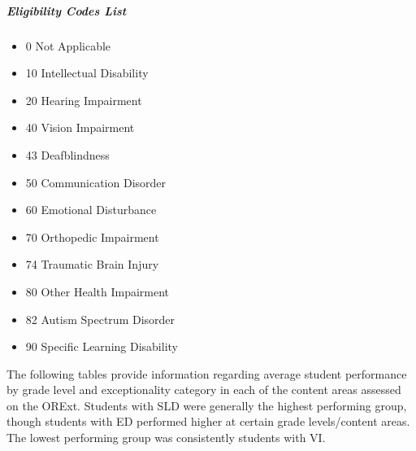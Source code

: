 \documentclass[]{article}
\providecommand{\tightlist}{%
  \setlength{\itemsep}{0pt}\setlength{\parskip}{0pt}}
\let\oldsubparagraph\subparagraph
\renewcommand{\subparagraph}[1]{\oldsubparagraph{#1}\mbox{}}
\begin{document}
\subparagraph{Eligibility Codes List}\label{eligibility-codes-list}

\begin{itemize}
\tightlist
\item
  0 Not Applicable
\item
  10 Intellectual Disability
\item
  20 Hearing Impairment
\item
  40 Vision Impairment
\item
  43 Deafblindness
\item
  50 Communication Disorder
\item
  60 Emotional Disturbance
\item
  70 Orthopedic Impairment
\item
  74 Traumatic Brain Injury
\item
  80 Other Health Impairment
\item
  82 Autism Spectrum Disorder
\item
  90 Specific Learning Disability
\end{itemize}

The following tables provide information regarding average student
performance by grade level and exceptionality category in each of the
content areas assessed on the ORExt. Students with SLD were generally
the highest performing group, though students with ED performed higher
at certain grade levels/content areas. The lowest performing group was
consistently students with VI. \FloatBarrier
\end{document}
